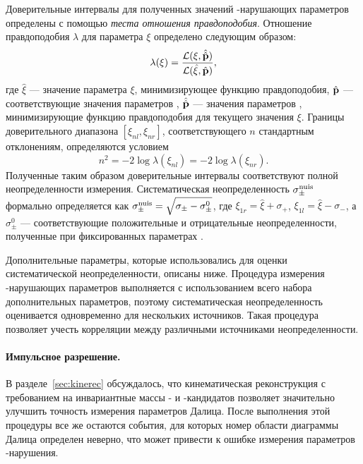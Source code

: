 Доверительные интервалы для полученных значений \cpconj-нарушающих параметров определены с помощью \emph{теста отношения правдоподобия}.  Отношение правдоподобия $\lambda$ для параметра $\xi$ определено следующим образом:
\begin{equation}\label{eq:confidence_intervals}
 \lambda(\xi)=\frac{\mathcal{L}(\xi,\hat{\hat{\mathbf{p}}})}{\mathcal{L}(\hat{\xi},\hat{\mathbf{p}})},
\end{equation}
где $\hat{\xi}$ --- значение параметра $\xi$, минимизирующее функцию правдоподобия, $\hat{\mathbf{p}}$ --- соответствующие значения параметров \vecp, $\hat{\hat{\mathbf{p}}}$ --- значения параметров \vecp, минимизирующие функцию правдоподобия для текущего значения $\xi$.  Границы доверительного диапазона $[\xi_{nl},\xi_{nr}]$, соответствующего $n$ стандартным отклонениям, определяются условием
\begin{equation}
 n^{2} = -2\log\lambda(\xi_{nl}) = -2\log\lambda(\xi_{nr}).
\end{equation}
Полученные таким образом доверительные интервалы соответствуют полной неопределенности измерения.  Систематическая неопределенность $\sigma^{\mathrm{nuis}}_{\pm}$ формально определяется как $\sigma^{\mathrm{nuis}}_{\pm} = \sqrt{\sigma_{\pm} - \sigma^{0}_{\pm}}$, где $\xi_{1r} = \hat{\xi} + \sigma_+$, $\xi_{1l} = \hat{\xi} - \sigma_-$, а $\sigma^{0}_{\pm}$ --- соответствующие положительные и отрицательные неопределенности, полученные при фиксированных параметрах \vecp.

Дополнительные параметры, которые использовались для оценки систематической неопределенности, описаны ниже.  Процедура измерения \cpconj-нарушающих параметров выполняется с использованием всего набора дополнительных параметров, поэтому систематическая неопределенность оценивается одновременно для нескольких источников.  Такая процедура позволяет учесть корреляции между различными источниками неопределенности.

\paragraph{Импульсное разрешение. }%
В разделе~\ref{sec:kinerec} обсуждалось, что кинематическая реконструкция с требованием на инвариантные массы \ks- и \dn-кандидатов позволяет значительно улучшить точность измерения параметров Далица.  После выполнения этой процедуры все же остаются события, для которых номер области диаграммы Далица определен неверно, что может привести к ошибке измерения параметров \cpconj-нарушения.

